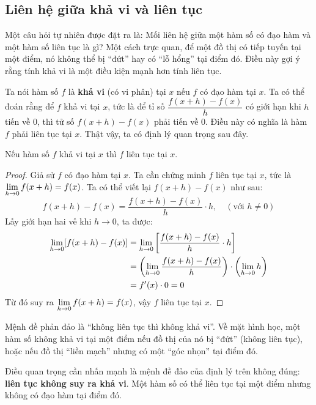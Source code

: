 \subsection{Liên hệ giữa khả vi và liên tục}

Một câu hỏi tự nhiên được đặt ra là: Mối liên hệ giữa một hàm số có đạo hàm và một hàm số liên tục là gì? Một cách trực quan, để một đồ thị có tiếp tuyến tại một điểm, nó không thể bị ``đứt'' hay có ``lỗ hổng'' tại điểm đó. Điều này gợi ý rằng tính khả vi là một điều kiện mạnh hơn tính liên tục.

Ta nói hàm số $f$ là \textbf{khả vi} (có vi phân) tại $x$ nếu $f$ có đạo hàm tại $x$. Ta có thể đoán rằng để $f$ khả vi tại $x$, tức là để tỉ số $\dfrac{f(x+h)-f(x)}{h}$ có giới hạn khi $h$ tiến về 0, thì tử số $f(x+h)-f(x)$ phải tiến về 0. Điều này có nghĩa là hàm $f$ phải liên tục tại $x$. Thật vậy, ta có định lý quan trọng sau đây.

\begin{theorem}
Nếu hàm số $f$ khả vi tại $x$ thì $f$ liên tục tại $x$.
\end{theorem}

\begin{proof}
Giả sử $f$ có đạo hàm tại $x$. Ta cần chứng minh $f$ liên tục tại $x$, tức là $\lim\limits_{h \to 0} f(x+h) = f(x)$.
Ta có thể viết lại $f(x+h) - f(x)$ như sau:
$$
f(x+h) - f(x) = \dfrac{f(x+h) - f(x)}{h} \cdot h, \quad (\text{với } h \neq 0)
$$
Lấy giới hạn hai vế khi $h \to 0$, ta được:
\begin{align*}
\lim\limits_{h \to 0} [f(x+h) - f(x)] &= \lim\limits_{h \to 0} \left[ \dfrac{f(x+h) - f(x)}{h} \cdot h \right] \\
&= \left( \lim\limits_{h \to 0} \dfrac{f(x+h) - f(x)}{h} \right) \cdot \left( \lim\limits_{h \to 0} h \right) \\
&= f'(x) \cdot 0 = 0
\end{align*}
Từ đó suy ra $\lim\limits_{h \to 0} f(x+h) = f(x)$, vậy $f$ liên tục tại $x$.
\end{proof}

Mệnh đề phản đảo là ``không liên tục thì không khả vi''. Về mặt hình học, một hàm số không khả vi tại một điểm nếu đồ thị của nó bị ``đứt'' (không liên tục), hoặc nếu đồ thị ``liền mạch'' nhưng có một ``góc nhọn'' tại điểm đó.

Điều quan trọng cần nhấn mạnh là mệnh đề đảo của định lý trên không đúng: \textbf{liên tục không suy ra khả vi}. Một hàm số có thể liên tục tại một điểm nhưng không có đạo hàm tại điểm đó.

